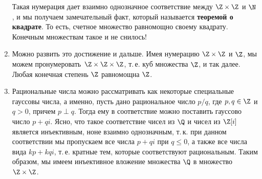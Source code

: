 \begin{enumerate}

Такая нумерация дает взаимно однозначное соответствие между $\Z\times\Z$ и $\N$, и мы получаем замечательный факт, который называется \textbf{теоремой о квадрате}. То есть, счетное множество равномощно своему квадрату. Конечным множествам такое и не снилось!
\item Можно развить это достижение и дальше. Имея нумерацию $\Z\times\Z$ и $\Z$, мы можем пронумеровать $\Z\times\Z\times\Z$, т.\,е. куб множества $\Z$, и так далее. Любая конечная степень $\Z$ равномощна $\Z$.

\item Рациональные числа можно рассматривать как некоторые специальные гауссовы числа, а именно, пусть дано рациональное число $p/q$, где $p,q\in\Z$ и $q>0$, причем $p\perp q$. Тогда ему в соответствие можно поставить гауссово число $p+qi$. Ясно, что такое соответствие чисел из $\Q$ и чисел из $\Z[i]$ является инъективным, ноне взаимно однозначным, т.\,к. при данном соответствии мы пропускаем все числа $p+qi$ при $q\le 0$, а также все числа вида $kp+kqi$, т.\,е. кратные тем, которые соответствуют рациональным. Таким образом, мы имеем инъективное вложение множества $\Q$ в множество $\Z\times\Z$.


\end{enumerate}
